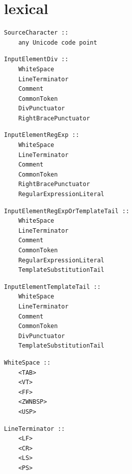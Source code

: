 
\section{lexical}

\noindent\textbf{\texttt{}}\par
\begin{lstlisting}
SourceCharacter ::
    any Unicode code point
\end{lstlisting}

\noindent\textbf{\texttt{}}\par
\begin{lstlisting}
InputElementDiv ::
    WhiteSpace
    LineTerminator
    Comment
    CommonToken
    DivPunctuator
    RightBracePunctuator
\end{lstlisting}

\noindent\textbf{\texttt{}}\par
\begin{lstlisting}
InputElementRegExp ::
    WhiteSpace
    LineTerminator
    Comment
    CommonToken
    RightBracePunctuator
    RegularExpressionLiteral
\end{lstlisting}

\noindent\textbf{\texttt{}}\par
\begin{lstlisting}
InputElementRegExpOrTemplateTail ::
    WhiteSpace
    LineTerminator
    Comment
    CommonToken
    RegularExpressionLiteral
    TemplateSubstitutionTail
\end{lstlisting}

\noindent\textbf{\texttt{}}\par
\begin{lstlisting}
InputElementTemplateTail ::
    WhiteSpace
    LineTerminator
    Comment
    CommonToken
    DivPunctuator
    TemplateSubstitutionTail
\end{lstlisting}

\noindent\textbf{\texttt{}}\par
\begin{lstlisting}
WhiteSpace ::
    <TAB>
    <VT>
    <FF>
    <ZWNBSP>
    <USP>
\end{lstlisting}

\noindent\textbf{\texttt{}}\par
\begin{lstlisting}
LineTerminator ::
    <LF>
    <CR>
    <LS>
    <PS>
\end{lstlisting}

